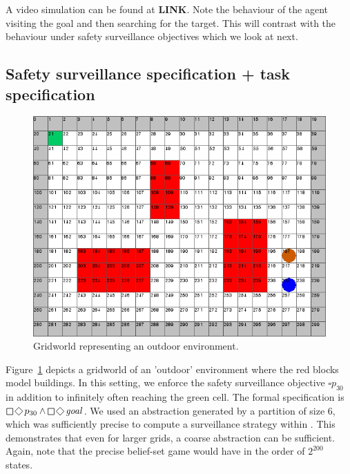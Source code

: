 
A video simulation can be found at \textbf{LINK}. Note the behaviour of the agent visiting the goal and then searching for the target. This will contrast with the behaviour under safety surveillance objectives which we look at next.

\subsection{Safety surveillance specification + task specification}
\begin{figure}
\centering
\includegraphics[scale=0.3]{case2.png}\caption{Gridworld representing an outdoor environment.}\label{fig:case2}
\vspace{-.5cm}
\end{figure}
Figure~\ref{fig:case2} depicts a gridworld of an 'outdoor' environment where the red blocks model buildings. 
In this setting, we enforce the safety surveillance objective $\square p_{30}$ in addition to infinitely often reaching the green cell. The formal specification is $\LTLglobally\LTLfinally p_{30} \wedge \LTLglobally\LTLfinally \mathit{goal}$. 
We used an abstraction generated by a partition of size 6, which was sufficiently precise to compute a surveillance strategy within . This demonstrates that even for larger grids, a coarse abstraction can be sufficient. Again, note that the precise belief-set game would have in the order of $2^{200}$ states.
 
